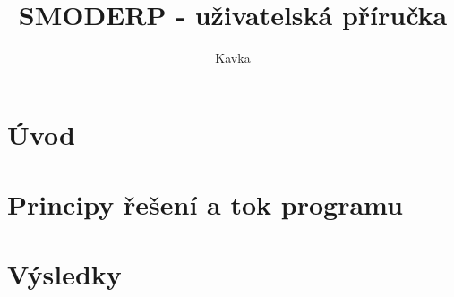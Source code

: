 \documentclass[a4paper, 11pt, twoside]{article}
\begin{document}
\title{SMODERP - uživatelská příručka}
\author{Kavka}


\clearpage\maketitle
\thispagestyle{empty}



\newpage
{}\setcounter{page}{1} %
\tableofcontents{}


%




\newpage
{}\setcounter{page}{1}%
\section*{Úvod}


% 

\newpage
\section{Principy řešení a tok programu}


\newpage
\section{Výsledky}


\newpage

\end{document}
